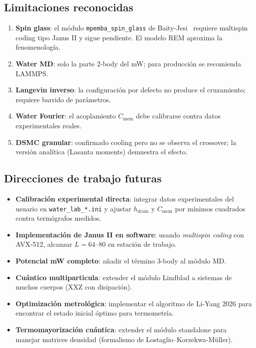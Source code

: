 \subsection{Limitaciones reconocidas}

\begin{enumerate}
\item \textbf{Spin glass}: el módulo \texttt{mpemba\_spin\_glass} de 
Baity-Jesi~\cite{baityjesi2019} requiere multispin coding tipo Janus II y 
sigue pendiente. El modelo REM aproxima la fenomenología.
\item \textbf{Water MD}: solo la parte 2-body del mW; para producción se 
recomienda LAMMPS.
\item \textbf{Langevin inverso}: la configuración por defecto no produce el 
cruzamiento; requiere barrido de parámetros.
\item \textbf{Water Fourier}: el acoplamiento $C_{\mathrm{mem}}$ debe 
calibrarse contra datos experimentales reales.
\item \textbf{DSMC granular}: confirmado cooling pero no se observa el 
crossover; la versión analítica (Lasanta moments) demuestra el efecto.
\end{enumerate}

\subsection{Direcciones de trabajo futuras}

\begin{itemize}
\item \textbf{Calibración experimental directa}: integrar datos experimentales 
del usuario en \texttt{water\_lab\_*.ini} y ajustar $h_{\mathrm{drain}}$ y 
$C_{\mathrm{mem}}$ por mínimos cuadrados contra termógrafos medidos.
\item \textbf{Implementación de Janus II en software}: usando \emph{multispin 
coding} con AVX-512, alcanzar $L = 64$--$80$ en estación de trabajo.
\item \textbf{Potencial mW completo}: añadir el término 3-body al módulo MD.
\item \textbf{Cuántico multiparticula}: extender el módulo Lindblad a sistemas 
de muchos cuerpos (XXZ con disipación).
\item \textbf{Optimización metrológica}: implementar el algoritmo de Li-Yang 
2026 para encontrar el estado inicial óptimo para termometría.
\item \textbf{Termomayorización cuántica}: extender el módulo standalone para 
manejar matrices densidad (formalismo de Lostaglio--Korzekwa-Müller).
\end{itemize}

